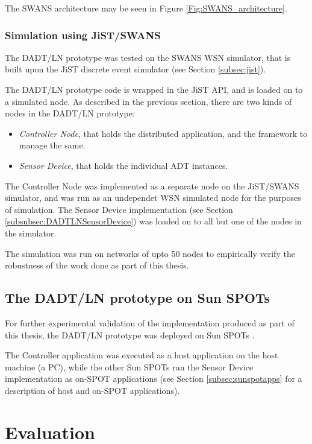 The SWANS architecture may be seen in Figure \ref{Fig:SWANS_architecture}. 


\subsubsection{Simulation using JiST/SWANS}

The DADT/LN prototype was tested on the SWANS WSN simulator, that is built upon
the JiST discrete event simulator (see Section \ref{subsec:jist}). 

The DADT/LN prototype code is wrapped in the JiST API, and is loaded on to a
simulated node. As described in the previous section, there are two kinds of
nodes in the DADT/LN prototype:

\begin{itemize}
  \item \emph{Controller Node}, that holds the distributed application, and the
  framework to manage the same.
  \item \emph{Sensor Device}, that holds the individual ADT instances. 
\end{itemize}

The Controller Node was implemented as a separate node on the JiST/SWANS
simulator, and was run as an undependet WSN simulated node for the purposes of
simulation. The Sensor Device implementation (see Section
\ref{subsubsec:DADTLNSensorDevice}) was loaded on to all but one of the nodes in
the simulator.

The simulation was run on networks of upto 50 nodes to empirically verify the
robustness of the work done as part of this thesis.

\subsection{The DADT/LN prototype on Sun SPOTs}

For further experimental validation of the implementation produced as part of 
this thesis,
the DADT/LN prototype was deployed on Sun SPOTs \cite{simon_squawk:2006}. 

The
Controller application was executed as a host application on the host machine (a
PC), while the other Sun SPOTs ran the Sensor Device implementation as on-SPOT
applications (see Section \ref{subsec:sunspotapps} for a description of host and on-SPOT
applications).

\section{Evaluation}

